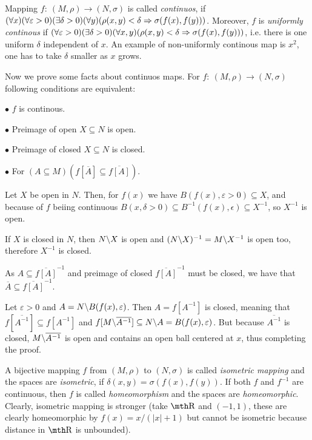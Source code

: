 \medskip

Mapping $f:\ (M,\rho)\to(N,\sigma)$ is called {\it continuos}, if $(\forall x)
(\forall \varepsilon > 0)(\exists \delta > 0)(\forall y)(\rho(x,y) < \delta 
\Rightarrow \sigma(f(x),f(y)))$. Moreover, $f$ is {\it uniformly continous} if 
$(\forall \varepsilon>0)(\exists \delta > 0)(\forall x,y)(\rho(x,y) < \delta 
\Rightarrow \sigma(f(x),f(y)))$, i.e. there is one uniform $\delta$ independent of 
$x$.
\smallskip
An example of non-uniformly continous map is $x^2$, one has to take $\delta$ 
smaller as $x$ grows.

\medskip
Now we prove some facts about continuos maps. For $f:\ (M,\rho)\to(N,\sigma)$ 
following conditions are equivalent:

{\parindent0.5in\parskip6pt
	\item{$\bullet$} $f$ is continous.
	\item{$\bullet$} Preimage of open $X\subseteq N$ is open.
	\item{$\bullet$} Preimage of closed $X\subseteq N$ is closed.
	\item{$\bullet$} For $(A\subseteq M)(f[\overline A] \subseteq \overline
		{f[A]})$.

}

Let $X$ be open in $N$. Then, for $f(x)$ we have $B(f(x),\varepsilon>0)
\subseteq X$, and because of $f$ beiing continuous $B(x,\delta>0)\subseteq 
B^{-1}(f(x), \epsilon) \subseteq X^{-1}$, so $X^{-1}$ is open. 

If $X$ is closed in $N$, then $N\backslash X$ is open and $(N\backslash X)^{-1} = 
M\backslash X^{-1}$ is open too, therefore $X^{-1}$ is closed.

As $A\subseteq \overline{f[A]}^{-1}$ and preimage of closed $\overline{f[A]}^
{-1}$ must be closed, we have that $\overline A\subseteq \overline{f[A]}^{-1}$.

Let $\varepsilon > 0$ and $A=N\backslash B(f(x),\varepsilon)$. Then $A=f[A^{-1}]$ is 
closed, meaning that $f[\overline{A^{-1}}] \subseteq f[A^{-1}]$ and $f[M\backslash 
\overline{ A^{-1}}] \subseteq N\backslash A = B(f(x),\varepsilon)$. But because 
$\overline{ A^{-1}}$ is closed, $M\backslash \overline{ A^{-1}}$ is open and contains 
an open ball centered at $x$, thus completing the proof.

\medskip

 A bijective mapping $f$ from $(M,\rho)$ to $(N,\sigma)$ is 
called {\it isometric mapping} and the spaces are {\it isometric}, if 
$\delta(x,y) = \sigma(f(x),f(y))$. If both $f$ and $f^{-1}$ are continuous, 
then $f$ is called {\it homeomorphism} and the spaces are {\it homeomorphic}. 
Clearly, isometric mapping is stronger (take $\R$ and $(-1,1)$, these are 
clearly homeomorphic by $f(x) = x/(|x|+1)$ but cannot be isometric because 
distance in $\R$ is unbounded).
\smallskip

